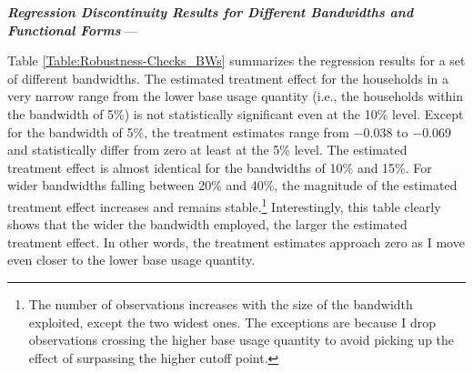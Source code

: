 \noindent
\textit{\textbf{Regression Discontinuity Results for Different Bandwidths and Functional Forms}} --- 

Table \ref{Table:Robustness-Checks_BWs} summarizes the regression results for a set of different bandwidths. The estimated treatment effect for the households in a very narrow range from the lower base usage quantity (i.e., the households within the bandwidth of 5\%) is not statistically significant even at the 10\% level. Except for the bandwidth of 5\%, the treatment estimates range from $-$0.038 to $-$0.069 and statistically differ from zero at least at the 5\% level. The estimated treatment effect is almost identical for the bandwidths of 10\% and 15\%. For wider bandwidths falling between 20\% and 40\%, the magnitude of the estimated treatment effect increases and remains stable.\footnote{The number of observations increases with the size of the bandwidth exploited, except the two widest ones. The exceptions are because I drop observations crossing the higher base usage quantity to avoid picking up the effect of surpassing the higher cutoff point.} Interestingly, this table clearly shows that the wider the bandwidth employed, the larger the estimated treatment effect. In other words, the treatment estimates approach zero as I move even closer to the lower base usage quantity.

